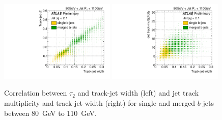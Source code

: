 
\begin{figure}[tp]
\centering
\includegraphics[width=0.49\textwidth]{FIGS/VarsSingleMerged/Tau2trkWidth080.pdf}
\includegraphics[width=0.49\textwidth]{FIGS/VarsSingleMerged/NtrktrkWidth080.pdf}
\caption{Correlation between $\tau _2$ and track-jet width (left) and jet track multiplicity and track-jet width (right) for single and merged $b$-jets between 80~GeV to 110~GeV. }
\label{fig:tau2trkwidthsinglemerged}
\end{figure}

